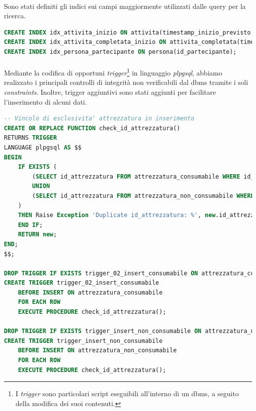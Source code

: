 \documentclass[12pt,a4paper,twoside,english,italian]{book}
\begin{document}
\paragraph{} Sono stati definiti gli indici sui campi maggiormente utilizzati dalle query per la ricerca. 

\begin{lstlisting}[language=SQL, caption=Esempio di implementazione di indici]
CREATE INDEX idx_attivita_inizio ON attivita(timestamp_inizio_previsto, timestamp_fine_previsto);
CREATE INDEX idx_attivita_completata_inizio ON attivita_completata(timestamp_inizio_effettivo, timestamp_fine_effettivo); -- Per quantita' stimata di attrezzaura consumabile
CREATE INDEX idx_persona_partecipante ON persona(id_partecipante);
\end{lstlisting}

\paragraph{} Mediante la codifica di opportuni \emph{trigger}\footnote{I \emph{trigger} sono particolari script eseguibili all'interno di un dbms, a seguito della modifica dei suoi contenuti.} in linguaggio \emph{plpgsql}, abbiamo realizzato i principali controlli di integrità non verificabili dal dbms tramite i soli \emph{constraints}. Inoltre, trigger aggiuntivi sono stati aggiunti per facilitare l'inserimento di alcuni dati.

\begin{lstlisting}[language=SQL, caption=Esempio di implementazione di trigger]
-- Vincolo di esclusivita' attrezzatura in inserimento
CREATE OR REPLACE FUNCTION check_id_attrezzatura()
RETURNS TRIGGER
LANGUAGE plpgsql AS $$
BEGIN
    IF EXISTS (
        (SELECT id_attrezzatura FROM attrezzatura_consumabile WHERE id_attrezzatura = new.id_attrezzatura)
        UNION
        (SELECT id_attrezzatura FROM attrezzatura_non_consumabile WHERE id_attrezzatura = new.id_attrezzatura)
    )
    THEN Raise Exception 'Duplicate id_attrezzatura: %', new.id_attrezzatura;
    END IF;
    RETURN new;
END;
$$;

DROP TRIGGER IF EXISTS trigger_02_insert_consumabile ON attrezzatura_consumabile; -- Il '02' nel nome serve perche' i trigger su una tabella sono controllati in ordine alfabetico
CREATE TRIGGER trigger_02_insert_consumabile
    BEFORE INSERT ON attrezzatura_consumabile
    FOR EACH ROW
    EXECUTE PROCEDURE check_id_attrezzatura();

DROP TRIGGER IF EXISTS trigger_insert_non_consumabile ON attrezzatura_non_consumabile;
CREATE TRIGGER trigger_insert_non_consumabile
    BEFORE INSERT ON attrezzatura_non_consumabile
    FOR EACH ROW
    EXECUTE PROCEDURE check_id_attrezzatura();
\end{lstlisting}
\end{document}
